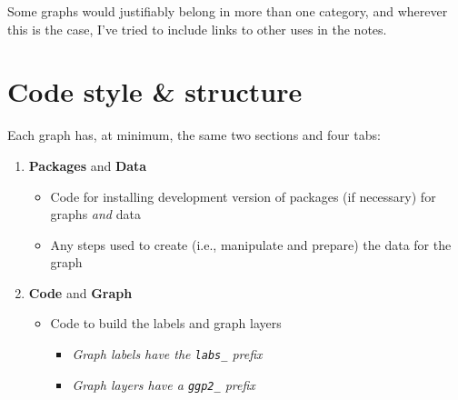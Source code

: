 \documentclass[
  letterpaper,
  DIV=11,
  numbers=noendperiod,
  oneside]{scrreprt}
\providecommand{\tightlist}{%
  \setlength{\itemsep}{0pt}\setlength{\parskip}{0pt}}\usepackage{longtable,booktabs,array}
\begin{document}
Some graphs would justifiably belong in more than one category, and
wherever this is the case, I've tried to include links to other uses in
the notes.

\hypertarget{code-style-structure}{%
\section*{Code style \& structure}\label{code-style-structure}}

Each graph has, at minimum, the same two sections and four tabs:

\begin{enumerate}
\def\labelenumi{\arabic{enumi}.}
\tightlist
\item
  \textbf{Packages} and \textbf{Data}

  \begin{itemize}
  \tightlist
  \item
    Code for installing development version of packages (if necessary)
    for graphs \emph{and} data\\
  \item
    Any steps used to create (i.e., manipulate and prepare) the data for
    the graph\\
  \end{itemize}
\item
  \textbf{Code} and \textbf{Graph}

  \begin{itemize}
  \tightlist
  \item
    Code to build the labels and graph layers

    \begin{itemize}
    \tightlist
    \item
      \emph{Graph labels have the \texttt{labs\_} prefix}\\
    \item
      \emph{Graph layers have a \texttt{ggp2\_} prefix}
    \end{itemize}
  \end{itemize}
\end{enumerate}
\end{document}
